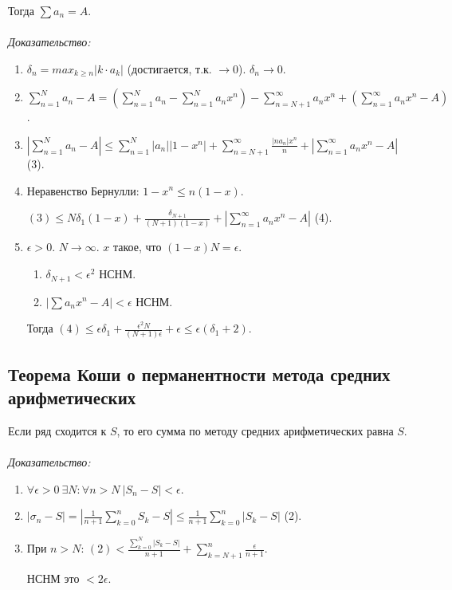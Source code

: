 \documentclass[paper=a4, fontsize=11pt]{article}
\begin{document}
Тогда $\sum a_n = A$.
\\\\
\emph{Доказательство:}
\begin{enumerate}
    \item $\delta_n = max_{k \geq n}|k \cdot a_k|$ (достигается, т.к. $\to 0$). $\delta_n \to 0$.
    \item $\sum_{n=1}^N a_n - A = (\sum_{n=1}^N a_n - \sum_{n=1}^N a_n x^n) - \sum_{n=N+1}^{\infty}a_nx^n +
    (\sum_{n=1}^{\infty}a_nx^n - A)$.
    \item $|\sum_{n=1}^N a_n - A| \leq \sum_{n=1}^N |a_n||1-x^n| + \sum_{n=N+1}^{\infty}\frac{|na_n|x^n}{n} +
    |\sum_{n=1}^{\infty} a_nx^n - A|$ (3).
    \item Неравенство Бернулли: $1-x^n \leq n(1-x)$.

    $(3) \leq N \delta_1(1-x) + \frac{\delta_{N+1}}{(N+1)(1-x)} + |\sum_{n=1}^{\infty} a_nx^n - A|$ (4).
    \item $\epsilon > 0$. $N \to \infty$. $x$ такое, что $(1-x)N=\epsilon$.
    \begin{enumerate}
        \item $\delta_{N+1} < \epsilon^2$ НСНМ.
        \item $|\sum a_nx^n - A| < \epsilon$ НСНМ.
    \end{enumerate}
    Тогда $(4) \leq \epsilon \delta_1 + \frac{\epsilon^2 N}{(N+1)\epsilon} + \epsilon \leq \epsilon(\delta_1 + 2)$.
\end{enumerate}

\subsection{Теорема Коши о перманентности метода средних арифметических}

Если ряд сходится к $S$, то его сумма по методу средних арифметических равна $S$.
\\\\
\emph{Доказательство:}
\begin{enumerate}
    \item $\forall \epsilon > 0\ \exists N: \forall n > N\ |S_n-S| < \epsilon$.
    \item $|\sigma_n - S| = |\frac{1}{n+1}\sum_{k=0}^n S_k - S| \leq \frac{1}{n+1} \sum_{k=0}^n |S_k - S|$ (2).
    \item При $n > N$: $(2) < \frac{\sum_{k=0}^N|S_k-S|}{n+1} + \sum_{k=N+1}^n \frac{\epsilon}{n+1}$.

    НСНМ это $< 2\epsilon$.
\end{enumerate}
\end{document}
